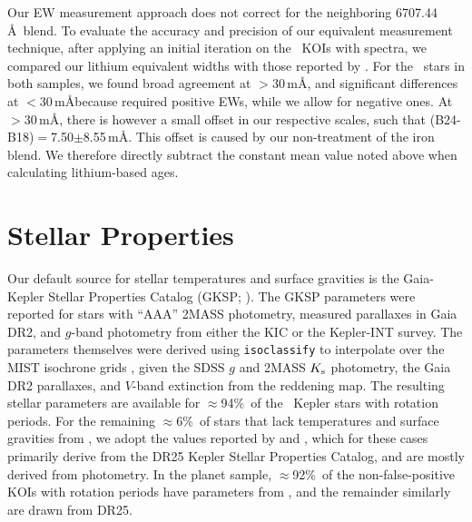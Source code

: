 \documentclass[11pt,twocolumn,tighten]{aastex63}
\newcommand{\fracstarswithprotwithbtwenty}{{$\approx$94\%}}
\newcommand{\fracstarswithprotwithoutbtwenty}{{$\approx$6\%}}
\newcommand{\frackoisnofpwithprotwithbtwenty}{{$\approx$92\%}}
\begin{document}
Our EW measurement approach does not correct for the neighboring
 6707.44\,\AA\ blend.  To evaluate the accuracy and
precision of our equivalent measurement technique, after applying an
initial iteration on the \nlithiumstars\ KOIs with spectra, we
compared our lithium equivalent widths with those reported by
\citet{2018ApJ...855..115B}.  For the \nbergeroverlap\ stars in both
samples, we found broad agreement at $>$30\,m\AA, and significant
differences at $<$30\,m\AA because \citet{2018ApJ...855..115B}
required positive EWs, while we allow for negative ones.  At
$>$30\,m\AA, there is however a small offset in our respective
scales, such that (B24-B18)$=$7.50$\pm$8.55\,m\AA.  This offset is
caused by our non-treatment of the iron blend.  We therefore directly
subtract the constant mean value noted above when calculating
lithium-based ages.




\section{Stellar Properties}
\label{sec:stellarprops}


Our default source for stellar temperatures and surface gravities is
the Gaia-Kepler Stellar Properties Catalog (GKSP;
\citealt{Berger_2020a_catalog}).  The GKSP parameters were reported
for stars with ``AAA'' 2MASS photometry, measured parallaxes in Gaia
DR2,  and $g$-band photometry from either the KIC or the Kepler-INT
survey.  The parameters themselves were derived using
\texttt{isoclassify} \citep{2017ApJ...844..102H} to interpolate over
the MIST isochrone grids
\citep{2016ApJ...823..102C,2016ApJS..222....8D}, given the SDSS $g$
and 2MASS $K_{\rm s}$ photometry, the Gaia DR2 parallaxes, and
$V$-band extinction from the \citet{2018MNRAS.478..651G} reddening
map.  The resulting stellar parameters are available for
\fracstarswithprotwithbtwenty\ of the \nuniqstarsantosrot\ Kepler
stars with rotation periods.  For the remaining
\fracstarswithprotwithoutbtwenty\ of stars that lack temperatures and
surface gravities from , we adopt the
values reported by \citet{Santos_2019} and \citet{Santos_2021}, which
for these cases primarily derive from the \citet{Mathur_2017} DR25
Kepler Stellar Properties Catalog, and are mostly derived from
photometry.  In the planet sample, \frackoisnofpwithprotwithbtwenty\
of the non-false-positive KOIs with rotation periods have parameters
from \citet{Berger_2020a_catalog}, and the remainder similarly are
drawn from DR25. 
\end{document}
